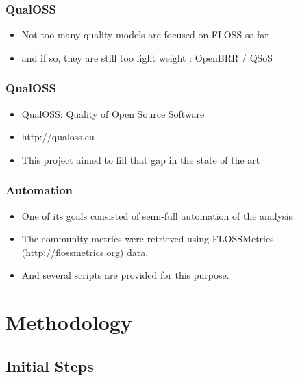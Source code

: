 \documentclass{beamer}
\begin{document}
\begin{frame}
\frametitle{QualOSS}
\begin{center}
\begin{itemize}
\item Not too many quality models are focused on FLOSS so far
\item and if so, they are still too light weight : OpenBRR / QSoS

\end{itemize}
\end{center}
\end{frame}



\begin{frame}
\frametitle{QualOSS}
\begin{center}
\begin{itemize}
\item QualOSS: Quality of Open Source Software
\item http://qualoss.eu
\item This project aimed to fill that gap in the state of the art

\end{itemize}
\end{center}
\end{frame}




\begin{frame}
\frametitle{Automation}
\begin{center}
\begin{itemize}
\item One of its goals consisted of semi-full automation of the analysis
\item The community metrics were retrieved using FLOSSMetrics (http://flossmetrics.org) data.
\item And several scripts are provided for this purpose.
\end{itemize}
\end{center}
\end{frame}


\section{Methodology}
\subsection{Initial Steps}
\end{document}

